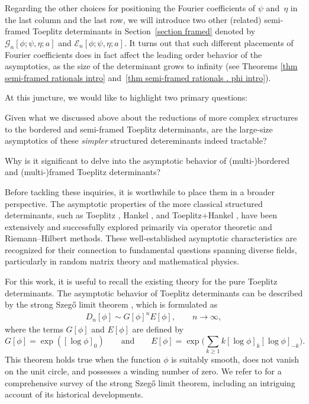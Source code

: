 \documentclass[10pt,a4paper]{amsart}
\numberwithin{equation}{section}
\begin{document}
\begin{Remark}
	Regarding the other choices for positioning the Fourier coefficients of $\psi$ and~$\eta$ in the last column and the last row, we will introduce two other (related) semi-framed Toeplitz determinants in Section~\ref{section framed} denoted by $\mathscr{G}_n[\phi;\psi,\eta;a]$ and $\mathscr{E}_n[\phi;\psi,\eta;a]$. It turns out that such different placements of Fourier coefficients does in fact affect the leading order behavior of the asymptotics, as the size of the determinant grows to infinity (see Theorems \ref{thm semi-framed rationals intro} and~\ref{thm semi-framed rationals . phi intro}).
\end{Remark}


At this juncture, we would like to highlight two primary questions:
\begin{Question}\label{q1}
 Given what we discussed above about the reductions of more complex structures to the bordered and semi-framed Toeplitz determinants, are the large-size asymptotics of these \textit{simpler} structured detereminants indeed tractable?
\end{Question}
	
\begin{Question}
\label{q2} Why is it significant to delve into the asymptotic behavior of (multi-)bordered and (mul\-ti-)framed Toeplitz determinants?
\end{Question}

Before tackling these inquiries, it is worthwhile to place them in a broader perspective. The asymptotic properties of the more classical structured determinants, such as Toeplitz \cite{BS1,BS,CIK,CK,DIK, Fahs, KV,Krasovsky1}, Hankel \cite{BGM,C,CG,DIK,ItsKrasovsky,Krasovsky}, and Toeplitz+Hankel \cite{BR,BE,BE2,Chelkak,GI}, have been extensively and successfully explored primarily via operator theoretic and Riemann--Hilbert methods. These well-established asymptotic characteristics are recognized for their connection to fundamental questions spanning diverse fields, particularly in random matrix theory and mathematical physics.

For this work, it is useful to recall the existing theory for the pure Toeplitz determinants. The asymptotic behavior of Toeplitz determinants can be described by the strong Szeg\H{o} limit theorem \cite{BS,Sz,WIDOMBlock}, which is formulated as
\begin{gather*}%
	D_{n}[\phi] \sim G[\phi]^{n} E[\phi], \qquad n\to\infty,
\end{gather*}
where the terms $G[\phi]$ and $E[\phi]$ are defined by
\begin{equation}\label{G and E}
	G[\phi] = \exp ([\log \phi]_{0}) \qquad \text{and}\qquad E[\phi] = \exp \bigg( \sum_{k \geq 1} k[\log \phi ]_{k}[\log \phi]_{-k} \bigg).
\end{equation}
This theorem holds true when the function $\phi$ is suitably smooth, does not vanish on the unit circle, and possesses a winding number of zero. We refer to \cite{DIK1} for a comprehensive survey of the strong Szeg\H{o} limit theorem, including an intriguing account of its historical developments.
\end{document}
